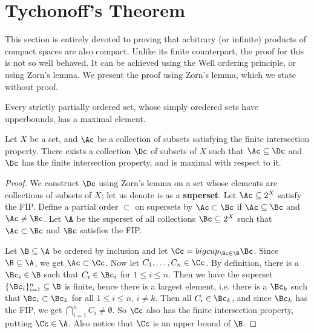 
\section{Tychonoff's Theorem}

This section is entirely devoted to proving that arbitrary  (or infinite) products of compact spaces
are also compact. Unlike its finite counterpart, the proof for this is not so well behaved. It can
be achieved using the Well ordering principle, or using Zorn's lemma. We present the proof using
Zorn's lemma, which we state without proof.

\begin{lemma}\label{3.5.1}
    Every strictly partially ordered set, whose simply oredered sets have upperbounds, has a maximal
    element.
\end{lemma}

\begin{lemma}\label{3.5.2}
    Let $X$ be a set, and  $\Ac$ be a collection of subsets satisfying the finite intersection
    property. There exists a collection  $\Dc$ of subsets of  $X$ such that  $\Ac \subseteq \Dc$ and
    $\Dc$ has the finite intersection property, and is maximal with respect to it.
\end{lemma}
\begin{proof}
    We construct $\Dc$ using Zorn's lemma on a set whose elements are collections of subsets of
    $X$; let us denote is as a  \textbf{superset}. Let $\Ac \subseteq 2^X$ satisfy the FIP. Define a
    partial order $\subset$ on supersets by  $\Ac \subset \Bc$ if  $\Ac \subseteq \Bc$ and  $\Ac
    \neq \Bc$. Let  $\A$ be the superset of all collections  $\Bc \subseteq 2^X$ such that  $\Ac
    \subset \Bc$ and  $\Bc$ satisfies the FIP.

    Let  $\B \subseteq \A$ be ordered by inclusion and let  $\Cc=bigcup_{\Bc \in \B}{\Bc}$. Since
    $\B \subseteq \A$, we get  $\Ac \subset \Cc$. Now let $C_1, \dots, C_n \in \Cc$. By definition,
    there is a $\Bc_i \in \B$ such that  $C_i \in \Bc_i$ for  $1 \leq i \leq n$. Then we have the
    superset  $\{\Bc_i\}_{i=1}^n \subseteq \B$ is finite, hence there is a largest element, i.e.
    there is a $\Bc_k$ such that  $\Bc_i \subset \Bc_k$ for all  $1 \leq i \leq n$,  $i \neq k$.
    Then all  $C_i \in \Bc_k$, and since  $\Bc_k$ has the FIP, we get  $\bigcap_{i=1}^n{C_i} \neq
    \emptyset$. So $\Cc$ also has the finite intersection property, putting  $\Cc \in \A$. Also
    notice that  $\Cc$ is an upper bound of  $\B$.
\end{proof}

